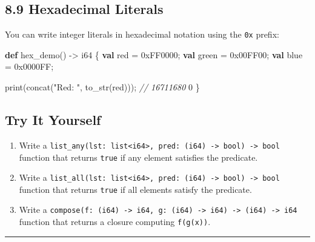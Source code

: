 \documentclass[
  english,
]{book}
\newenvironment{Shaded}{\begin{snugshade}}{\end{snugshade}}
\newcommand{\BaseNTok}[1]{\textcolor[rgb]{0.71,0.81,0.66}{#1}}
\newcommand{\CommentTok}[1]{\textcolor[rgb]{0.42,0.60,0.33}{\textit{#1}}}
\newcommand{\DataTypeTok}[1]{\textcolor[rgb]{0.31,0.79,0.69}{#1}}
\newcommand{\DecValTok}[1]{\textcolor[rgb]{0.71,0.81,0.66}{#1}}
\newcommand{\FunctionTok}[1]{\textcolor[rgb]{0.86,0.86,0.67}{#1}}
\newcommand{\KeywordTok}[1]{\textcolor[rgb]{0.34,0.61,0.84}{\textbf{#1}}}
\newcommand{\NormalTok}[1]{\textcolor[rgb]{0.83,0.83,0.83}{#1}}
\newcommand{\OperatorTok}[1]{\textcolor[rgb]{0.83,0.83,0.83}{#1}}
\newcommand{\StringTok}[1]{\textcolor[rgb]{0.81,0.57,0.47}{#1}}
\providecommand{\tightlist}{%
  \setlength{\itemsep}{0pt}\setlength{\parskip}{0pt}}
\begin{document}
\subsection{8.9 Hexadecimal Literals}\label{hexadecimal-literals}

You can write integer literals in hexadecimal notation using the
\texttt{0x} prefix:

\begin{Shaded}
\begin{Highlighting}[]
\KeywordTok{def}\NormalTok{ hex\_demo() }\OperatorTok{{-}\textgreater{}} \DataTypeTok{i64}\NormalTok{ \{}
    \KeywordTok{val}\NormalTok{ red }\OperatorTok{=} \BaseNTok{0xFF0000}\NormalTok{;}
    \KeywordTok{val}\NormalTok{ green }\OperatorTok{=} \BaseNTok{0x00FF00}\NormalTok{;}
    \KeywordTok{val}\NormalTok{ blue }\OperatorTok{=} \BaseNTok{0x0000FF}\NormalTok{;}
    
    \FunctionTok{print}\NormalTok{(}\FunctionTok{concat}\NormalTok{(}\StringTok{"Red: "}\NormalTok{, }\FunctionTok{to\_str}\NormalTok{(red))); }\CommentTok{// 16711680}
    \DecValTok{0}
\NormalTok{\}}
\end{Highlighting}
\end{Shaded}

\subsection{Try It Yourself}\label{try-it-yourself-7}

\begin{enumerate}
\def\labelenumi{\arabic{enumi}.}
\tightlist
\item
  Write a
  \texttt{list\_any(lst:\ list\textless{}i64\textgreater{},\ pred:\ (i64)\ -\textgreater{}\ bool)\ -\textgreater{}\ bool}
  function that returns \texttt{true} if any element satisfies the
  predicate.
\item
  Write a
  \texttt{list\_all(lst:\ list\textless{}i64\textgreater{},\ pred:\ (i64)\ -\textgreater{}\ bool)\ -\textgreater{}\ bool}
  function that returns \texttt{true} if all elements satisfy the
  predicate.
\item
  Write a
  \texttt{compose(f:\ (i64)\ -\textgreater{}\ i64,\ g:\ (i64)\ -\textgreater{}\ i64)\ -\textgreater{}\ (i64)\ -\textgreater{}\ i64}
  function that returns a closure computing \texttt{f(g(x))}.
\end{enumerate}

\begin{center}\rule{0.5\linewidth}{0.5pt}\end{center}
\end{document}
